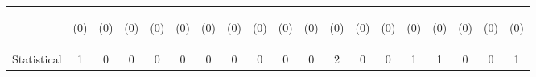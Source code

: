 \begin{tabular}{lcccccccccccccccccc}
 & \begin{footnotesize}(0)\end{footnotesize} & \begin{footnotesize}(0)\end{footnotesize} & \begin{footnotesize}(0)\end{footnotesize} & \begin{footnotesize}(0)\end{footnotesize} & \begin{footnotesize}(0)\end{footnotesize} & \begin{footnotesize}(0)\end{footnotesize} & \begin{footnotesize}(0)\end{footnotesize} & \begin{footnotesize}(0)\end{footnotesize} & \begin{footnotesize}(0)\end{footnotesize} & \begin{footnotesize}(0)\end{footnotesize} & \begin{footnotesize}(0)\end{footnotesize} & \begin{footnotesize}(0)\end{footnotesize} & \begin{footnotesize}(0)\end{footnotesize} & \begin{footnotesize}(0)\end{footnotesize} & \begin{footnotesize}(0)\end{footnotesize} & \begin{footnotesize}(0)\end{footnotesize} & \begin{footnotesize}(0)\end{footnotesize} & \begin{footnotesize}(0)\end{footnotesize}\\
\noalign{\smallskip}Statistical & 1 & 0 & 0 & 0 & 0 & 0 & 0 & 0 & 0 & 0 & 2 & 0 & 0 & 1 & 1 & 0 & 0 & 1\\

\end{tabular}
